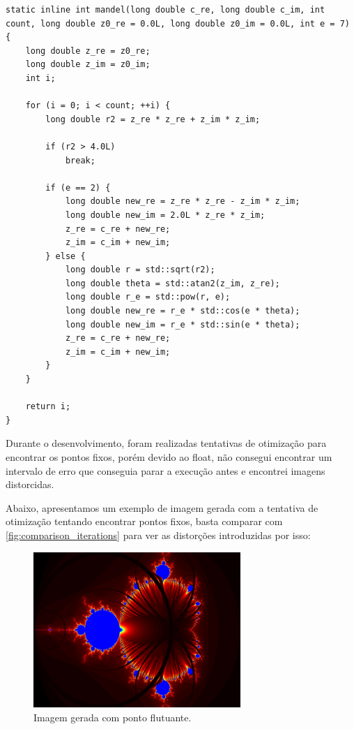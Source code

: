 \begin{lstlisting}[caption=Kernel do cálculo do conjunto de Mandelbrot]
static inline int mandel(long double c_re, long double c_im, int count, long double z0_re = 0.0L, long double z0_im = 0.0L, int e = 7)
{
    long double z_re = z0_re;
    long double z_im = z0_im;
    int i;

    for (i = 0; i < count; ++i) {
        long double r2 = z_re * z_re + z_im * z_im;

        if (r2 > 4.0L)
            break;

        if (e == 2) {
            long double new_re = z_re * z_re - z_im * z_im;
            long double new_im = 2.0L * z_re * z_im;
            z_re = c_re + new_re;
            z_im = c_im + new_im;
        } else {
            long double r = std::sqrt(r2);
            long double theta = std::atan2(z_im, z_re);
            long double r_e = std::pow(r, e);
            long double new_re = r_e * std::cos(e * theta);
            long double new_im = r_e * std::sin(e * theta);
            z_re = c_re + new_re;
            z_im = c_im + new_im;
        }
    }

    return i;
}
\end{lstlisting}

Durante o desenvolvimento, foram realizadas tentativas de otimização para encontrar os pontos fixos, porém devido ao float, não consegui encontrar um intervalo de erro que conseguia parar a execução antes e encontrei imagens distorcidas.

Abaixo, apresentamos um exemplo de imagem gerada com a tentativa de otimização tentando encontrar pontos fixos, basta comparar com \autoref{fig:comparison_iterations} para ver as distorções introduzidas por isso:
\begin{figure}[H]
    \centering
    \includegraphics[width=0.7\textwidth]{figures/comparacao/mandelbrot_float.png}
    \caption{Imagem gerada com ponto flutuante.}
    \label{fig:comparison_float}
\end{figure}

